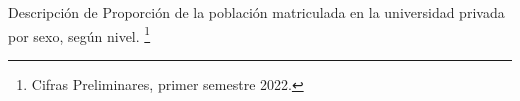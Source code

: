 Descripción de Proporción de la población matriculada en la universidad privada por sexo, según nivel. \footnote{Cifras Preliminares, primer semestre 2022.}